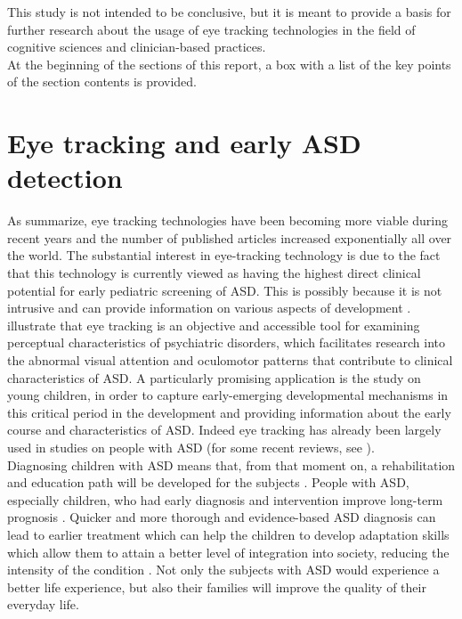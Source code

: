 This study is not intended to be conclusive, but it is meant to provide a basis for further research about the usage of eye tracking technologies in the field of cognitive sciences and clinician-based practices.\\
At the beginning of the sections of this report, a box with a list of the key points of the section contents is provided.




\section{Eye tracking and early ASD detection}
\label{sec:earlyASD}

As \cite{bolte2016detection} summarize, eye tracking technologies have been becoming more viable during recent years and the number of published articles increased exponentially all over the world. The substantial interest in eye-tracking technology is due to the fact that this technology is currently viewed as having the highest direct clinical potential for early pediatric screening of ASD. This is possibly because it is not intrusive and can provide information on various aspects of development  \citep{bolte2016detection,falck-ytter2013eyetrackingASD,subrahmaniam2013animation,sasson2012children}.\\
\cite{sasson2012children} illustrate that eye tracking is an objective and accessible tool for examining perceptual characteristics of psychiatric disorders, which facilitates research into the abnormal visual attention and oculomotor patterns that contribute to clinical characteristics of ASD. A particularly promising application is the study on young children, in order to capture early-emerging developmental mechanisms in this critical period in the development and providing information about the early course and characteristics of ASD. Indeed eye tracking has already been largely used in studies on people with ASD (for some recent reviews, see \citealp{boraston2007eyetrackingASD,brenner2007visualsearch,falck-ytter2013eyetrackingASD,papagiannopoulou2014review,chitategmark2016socialattention,johnson2016review,bolte2016detection,frazier2017socialgaze}).\\
Diagnosing children with ASD means that, from that moment on, a rehabilitation and education path will be developed for the subjects \citep{apa2017diagnosis}. People with ASD, especially children, who had early diagnosis and intervention improve long-term prognosis \citep{vargas2016diagnosis}. Quicker and more thorough and evidence-based ASD diagnosis can lead to earlier treatment which can help the children to develop adaptation skills which allow them to attain a better level of integration into society, reducing the intensity of the condition \citep{martineau2011pupil,towie2016screening}. Not only the subjects with ASD would experience a better life experience, but also their families will improve the quality of their everyday life.\\
